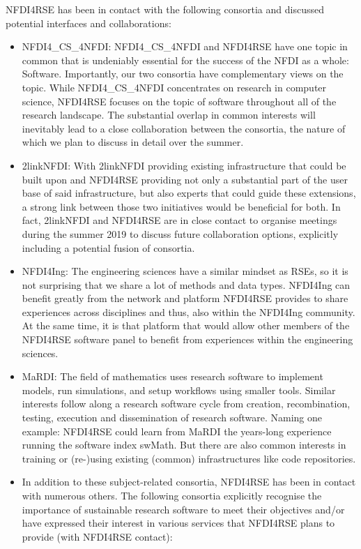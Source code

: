 \documentclass[11pt,a4paper,DIV=11]{scrlttr2}
\begin{document}
\begin{letter}{}
NFDI4RSE has been in contact with the following consortia and discussed potential interfaces and collaborations:
\begin{itemize}
 \setlength\itemsep{0em}
\item NFDI4\_CS\_4NFDI: NFDI4\_CS\_4NFDI and NFDI4RSE have one topic in common that is undeniably essential for the success of the NFDI as a whole: Software. Importantly, our two consortia have complementary views on the topic. While NFDI4\_CS\_4NFDI concentrates on research in computer science, NFDI4RSE focuses on the topic of software throughout all of the research landscape. The substantial overlap in common interests will inevitably lead to a close collaboration between the consortia, the nature of which we plan to discuss in detail over the summer. 
\item 2linkNFDI: With 2linkNFDI providing existing infrastructure that could be built upon and NFDI4RSE providing not only a substantial part of the user base of said infrastructure, but also experts that could guide these extensions, a strong link between those two initiatives would be beneficial for both. In fact, 2linkNFDI and NFDI4RSE are in close contact to organise meetings during the summer 2019 to discuss future collaboration options, explicitly including a potential fusion of consortia.
\item NFDI4Ing: The engineering sciences have a similar mindset as RSEs, so it is not surprising that we share a lot of methods and data types. NFDI4Ing can benefit greatly from the network and platform NFDI4RSE provides to share experiences across disciplines and thus, also within the NFDI4Ing community. At the same time, it is that platform that would allow other members of the NFDI4RSE software panel to benefit from experiences within the engineering sciences.
\item MaRDI: The field of mathematics uses research software to implement models, run simulations, and setup workflows using smaller tools. Similar interests follow along a research software cycle from creation, recombination, testing, execution and dissemination of research software. Naming one example: NFDI4RSE could learn from MaRDI the years-long experience running the software index swMath. But there are also common interests in training or (re-)using existing (common) infrastructures like code repositories. 
\item In addition to these subject-related consortia, NFDI4RSE has been in contact with numerous others. The following consortia explicitly recognise the importance of sustainable research software to meet their objectives and/or have expressed their interest in various services that NFDI4RSE plans to provide (with NFDI4RSE contact):

\end{itemize}
\end{letter}
\end{document}
